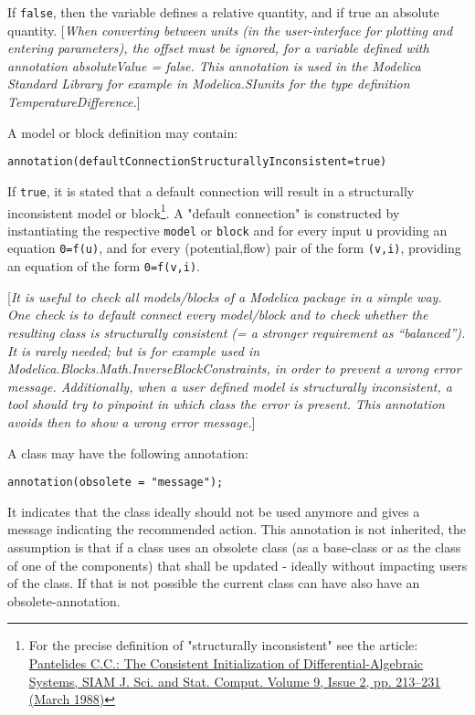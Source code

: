 If \lstinline!false!, then the variable defines a relative quantity, and if true an
absolute quantity. {[}\emph{When converting between units (in the
user-interface for plotting and entering parameters), the offset must be
ignored, for a variable defined with annotation absoluteValue = false.
This annotation is used in the Modelica Standard Library for example in
Modelica.SIunits for the type definition TemperatureDifference.}{]}

A model or block definition may contain:
\begin{lstlisting}[language=modelica]
  annotation(defaultConnectionStructurallyInconsistent=true)
\end{lstlisting}

If \lstinline!true!, it is stated that a default connection will result in a
structurally inconsistent model or block\footnote{For the precise
  definition of "structurally inconsistent" see the article:
  \href{http://epubs.siam.org/doi/abs/10.1137/0909014}{Pantelides C.C.:
  The Consistent Initialization of Differential-Algebraic Systems, SIAM
  J. Sci. and Stat. Comput. Volume 9, Issue 2, pp. 213--231 (March
  1988)}}. A "default connection" is constructed by instantiating the
respective \lstinline!model! or \lstinline!block! and for every input \lstinline!u! providing an equation
\lstinline!0=f(u)!, and for every (potential,flow) pair of the form \lstinline!(v,i)!, providing
an equation of the form \lstinline!0=f(v,i)!.

{[}\emph{It is useful to check all models/blocks of a Modelica package
in a simple way. One check is to default connect every model/block and
to check whether the resulting class is structurally consistent (= a
stronger requirement as ``balanced''). It is rarely needed; but is for
example used in Modelica.Blocks.Math.InverseBlockConstraints, in order
to prevent a wrong error message. Additionally, when a user defined
model is structurally inconsistent, a tool should try to pinpoint in
which class the error is present. This annotation avoids then to show a
wrong error message.}{]}

A class may have the following annotation:
\begin{lstlisting}[language=modelica]
  annotation(obsolete = "message");
\end{lstlisting}

It indicates that the class ideally should not be used anymore and gives
a message indicating the recommended action.
This annotation is not inherited, the assumption is that if a class uses
an obsolete class (as a base-class or as the class of one of the components)
that shall be updated - ideally without impacting users of the class.
If that is not possible the current class can have also have an obsolete-annotation.

